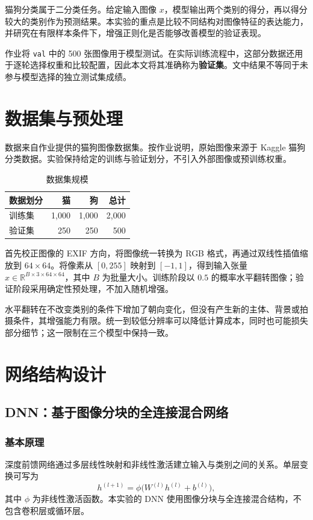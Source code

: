 \documentclass[UTF8,a4paper,zihao=-4,fontset=fandol]{ctexart}
\begin{document}
猫狗分类属于二分类任务。给定输入图像 $x$，模型输出两个类别的得分，再以得分较大的类别作为预测结果。本实验的重点是比较不同结构对图像特征的表达能力，并研究在有限样本条件下，增强正则化是否能够改善模型的验证表现。

作业将 \texttt{val} 中的 500 张图像用于模型测试。在实际训练流程中，这部分数据还用于逐轮选择权重和比较配置，因此本文将其准确称为\textbf{验证集}。文中结果不等同于未参与模型选择的独立测试集成绩。

\section{数据集与预处理}
数据来自作业提供的猫狗图像数据集。按作业说明，原始图像来源于 Kaggle 猫狗分类数据。实验保持给定的训练与验证划分，不引入外部图像或预训练权重。

\begin{table}[htbp]
\centering
\caption{数据集规模}
\begin{tabular}{lrrr}
\toprule
数据划分 & 猫 & 狗 & 总计\\
\midrule
训练集 & 1,000 & 1,000 & 2,000\\
验证集 & 250 & 250 & 500\\
\bottomrule
\end{tabular}
\end{table}

首先校正图像的 EXIF 方向，将图像统一转换为 RGB 格式，再通过双线性插值缩放到 $64\times64$。将像素从 $[0,255]$ 映射到 $[-1,1]$，得到输入张量 $x\in\mathbb{R}^{B\times3\times64\times64}$，其中 $B$ 为批量大小。训练阶段以 $0.5$ 的概率水平翻转图像；验证阶段采用确定性预处理，不加入随机增强。

水平翻转在不改变类别的条件下增加了朝向变化，但没有产生新的主体、背景或拍摄条件，其增强能力有限。统一到较低分辨率可以降低计算成本，同时也可能损失部分细节；这一限制在三个模型中保持一致。

\section{网络结构设计}
\subsection{DNN：基于图像分块的全连接混合网络}
\subsubsection{基本原理}
深度前馈网络通过多层线性映射和非线性激活建立输入与类别之间的关系。单层变换可写为
\begin{equation}
 h^{(l+1)}=\phi\bigl(W^{(l)}h^{(l)}+b^{(l)}\bigr),
\end{equation}
其中 $\phi$ 为非线性激活函数。本实验的 DNN 使用图像分块与全连接混合结构，不包含卷积层或循环层。
\end{document}

